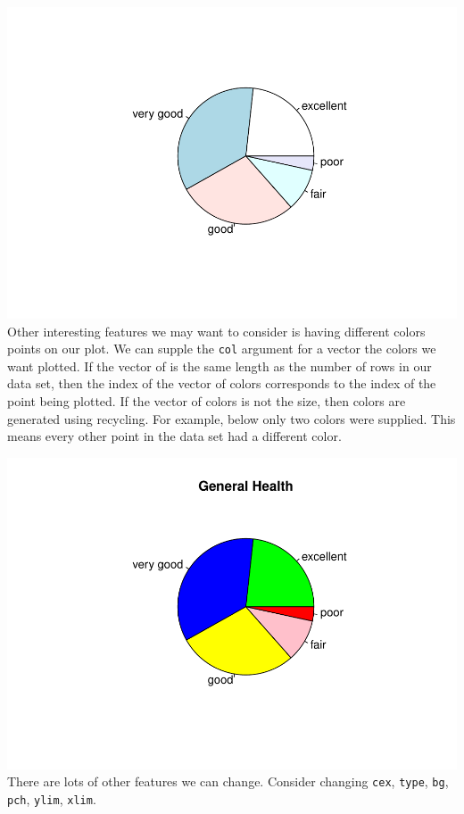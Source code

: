 \documentclass[
]{book}
\newenvironment{Shaded}{\begin{snugshade}}{\end{snugshade}}
\newcommand{\CommentTok}[1]{\textcolor[rgb]{0.56,0.35,0.01}{\textit{#1}}}
\newcommand{\DataTypeTok}[1]{\textcolor[rgb]{0.13,0.29,0.53}{#1}}
\newcommand{\KeywordTok}[1]{\textcolor[rgb]{0.13,0.29,0.53}{\textbf{#1}}}
\newcommand{\NormalTok}[1]{#1}
\newcommand{\OperatorTok}[1]{\textcolor[rgb]{0.81,0.36,0.00}{\textbf{#1}}}
\newcommand{\StringTok}[1]{\textcolor[rgb]{0.31,0.60,0.02}{#1}}
\begin{document}
\includegraphics{_main_files/figure-latex/unnamed-chunk-233-1.pdf}
Other interesting features we may want to consider is having different colors points on our plot. We can supple the \texttt{col} argument for a vector the colors we want plotted. If the vector of is the same length as the number of rows in our data set, then the index of the vector of colors corresponds to the index of the point being plotted. If the vector of colors is not the size, then colors are generated using recycling. For example, below only two colors were supplied. This means every other point in the data set had a different color.

\begin{Shaded}
\end{Shaded}

\includegraphics{_main_files/figure-latex/unnamed-chunk-234-1.pdf}
There are lots of other features we can change. Consider changing \texttt{cex}, \texttt{type}, \texttt{bg}, \texttt{pch}, \texttt{ylim}, \texttt{xlim}.
\end{document}
